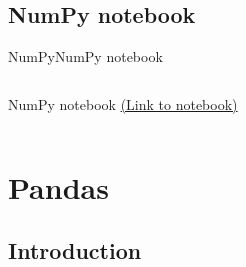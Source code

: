 \documentclass[10pt,compress]{beamer} %
\begin{document}
\subsection{NumPy notebook}
\begin{frame}{NumPy}{NumPy notebook}
    \begin{columns}
			\begin{block}{NumPy notebook}
			\href{https://github.com/dfbarrero/dataCourse/blob/master/numpy/numpy.ipynb}{(Link to notebook)}
			\end{block}
	\end{columns}
\end{frame}

\section{Pandas}
\subsection{Introduction}
\end{document}
